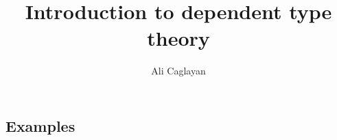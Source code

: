 \documentclass[varwidth]{article}
\title{Introduction to dependent type theory}
\author{Ali Caglayan}
\theoremstyle{definition}
\begin{document}
\maketitle

%

\tableofcontents























%





%

\newpage
\begin{appendices}
	
	
	\section{Examples}
	
    \begin{landscape}
        \centering
        \vspace*{\fill}
        
        
        \vfill
    \end{landscape}
	
\end{appendices}

 

\end{document}
